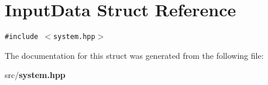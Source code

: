\section{Input\-Data Struct Reference}
\label{structInputData}
{\tt \#include $<$system.hpp$>$}



The documentation for this struct was generated from the following file:\begin{CompactItemize}
\item 
src/{\bf system.hpp}\end{CompactItemize}
